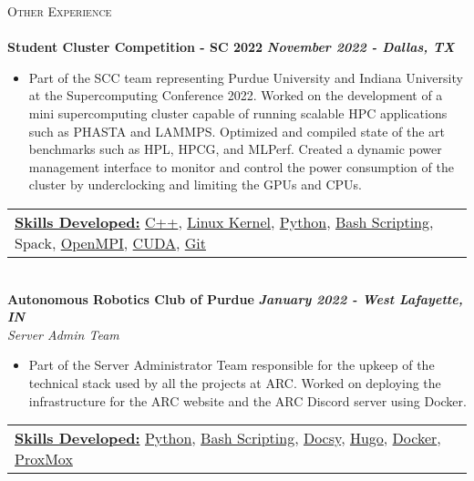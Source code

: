 \documentclass[a4paper]{article}
\newcommand{\lineunder} {
    \vspace*{-8pt} \\
    \hspace*{-18pt} \hrulefill \\
}
\newcommand{\header} [1] {
    {\hspace*{-18pt}\vspace*{6pt} \textsc{#1}}
    \vspace*{-6pt} \lineunder
}
\begin{document}
\header{Other Experience}
\textbf{Student Cluster Competition - SC 2022} \hfill \textbf{\textit {November 2022 - Dallas, TX}}\\
\vspace{-2mm}
\begin{itemize}
    \item Part of the SCC team representing Purdue University and Indiana University at the Supercomputing Conference 2022. 
    Worked on the development of a mini supercomputing cluster capable of running scalable HPC applications such as PHASTA and LAMMPS. 
    Optimized and compiled state of the art benchmarks such as HPL, HPCG, and MLPerf. Created a dynamic power management interface to monitor and control the power consumption of the cluster by underclocking and limiting the GPUs and CPUs.\\
\end{itemize}
\vspace{-1mm}
\begin{tabular}{ l l }
    \underline{\textbf {Skills Developed:}} \href{https://www.cplusplus.com/}{C++}, \href{https://www.kernel.org/}{Linux Kernel}, \href{https://www.python.org/}{Python}, \href{https://www.gnu.org/software/bash/}{Bash Scripting}, Spack, \href{https://www.open-mpi.org/}{OpenMPI}, \href{https://developer.nvidia.com/cuda-zone}{CUDA}, \href{https://git-scm.com/}{Git}
\end{tabular}\\
\vspace{1mm}
{\textbf{Autonomous Robotics Club of Purdue}} \hfill \textbf{\textit {January 2022 - West Lafayette, IN}}\\
\textit{Server Admin Team}
\vspace{-1mm}
\begin{itemize} \itemsep 1pt
    \item Part of the Server Administrator Team responsible for the upkeep of the technical stack used by all the projects at ARC.
    Worked on deploying the infrastructure for the ARC website and the ARC Discord server using Docker.
\end{itemize}
\begin{tabular}{ l l }
    \underline{\textbf {Skills Developed:}} \href{https://www.python.org/}{Python}, \href{https://www.gnu.org/software/bash/}{Bash Scripting}, \href{https://www.docsy.dev/}{Docsy}, \href{https://gohugo.io/about/what-is-hugo/}{Hugo}, \href{https://www.docker.com/}{Docker}, \href{https://www.proxmox.com/en/}{ProxMox}
\end{tabular} \\
\end{document}
